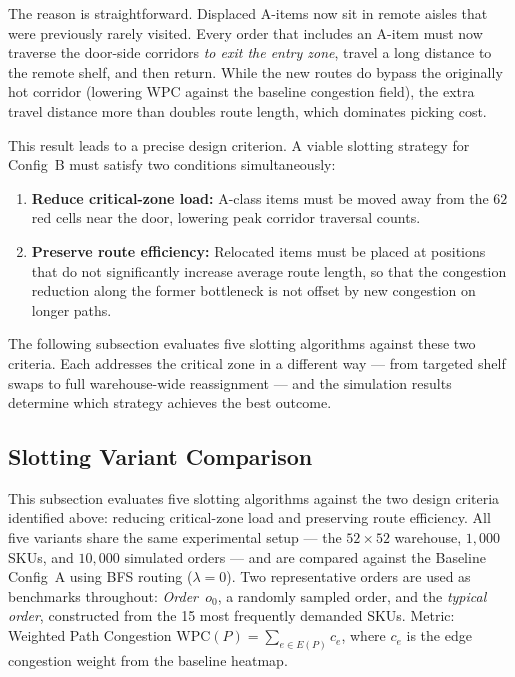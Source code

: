 \documentclass[12pt,a4paper]{article}
\begin{document}
The reason is straightforward. Displaced A-items now sit in remote aisles that were
previously rarely visited. Every order that includes an A-item must now traverse
the door-side corridors \emph{to exit the entry zone}, travel a long distance to the
remote shelf, and then return. While the new routes do bypass the originally hot
corridor (lowering WPC against the baseline congestion field), the extra travel
distance more than doubles route length, which dominates picking cost.

This result leads to a precise design criterion. A viable slotting strategy for
Config~B must satisfy two conditions simultaneously:
\begin{enumerate}
  \item \textbf{Reduce critical-zone load:} A-class items must be moved away from
    the $62$ red cells near the door, lowering peak corridor traversal counts.
  \item \textbf{Preserve route efficiency:} Relocated items must be placed at
    positions that do not significantly increase average route length, so that the
    congestion reduction along the former bottleneck is not offset by new congestion
    on longer paths.
\end{enumerate}

The following subsection evaluates five slotting algorithms against these two
criteria. Each addresses the critical zone in a different way --- from targeted
shelf swaps to full warehouse-wide reassignment --- and the simulation results
determine which strategy achieves the best outcome.

\subsection{Slotting Variant Comparison}

This subsection evaluates five slotting algorithms against the two design criteria
identified above: reducing critical-zone load and preserving route efficiency.
All five variants share the same experimental setup --- the $52\times52$ warehouse,
$1{,}000$ SKUs, and $10{,}000$ simulated orders --- and are compared against the
Baseline Config~A using BFS routing ($\lambda = 0$).
Two representative orders are used as benchmarks throughout:
\textit{Order~$o_0$}, a randomly sampled order, and the \textit{typical order},
constructed from the 15 most frequently demanded SKUs.
Metric: Weighted Path Congestion $\mathrm{WPC}(P)=\sum_{e\in E(P)}c_e$,
where $c_e$ is the edge congestion weight from the baseline heatmap.
\end{document}
